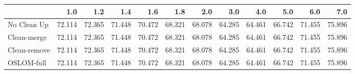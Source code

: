 \begin{tabular}{lrrrrrrrrrrr}
\toprule
{} &    1.0 &    1.2 &    1.4 &    1.6 &    1.8 &    2.0 &    3.0 &    4.0 &    5.0 &    6.0 &    7.0 \\
\midrule
No Clean Up  & 72.114 & 72.365 & 71.448 & 70.472 & 68.321 & 68.078 & 64.285 & 64.461 & 66.742 & 71.455 & 75.896 \\
Clean-merge  & 72.114 & 72.365 & 71.448 & 70.472 & 68.321 & 68.078 & 64.285 & 64.461 & 66.742 & 71.455 & 75.896 \\
Clean-remove & 72.114 & 72.365 & 71.448 & 70.472 & 68.321 & 68.078 & 64.285 & 64.461 & 66.742 & 71.455 & 75.896 \\
OSLOM-full   & 72.114 & 72.365 & 71.448 & 70.472 & 68.321 & 68.078 & 64.285 & 64.461 & 66.742 & 71.455 & 75.896 \\
\bottomrule
\end{tabular}
